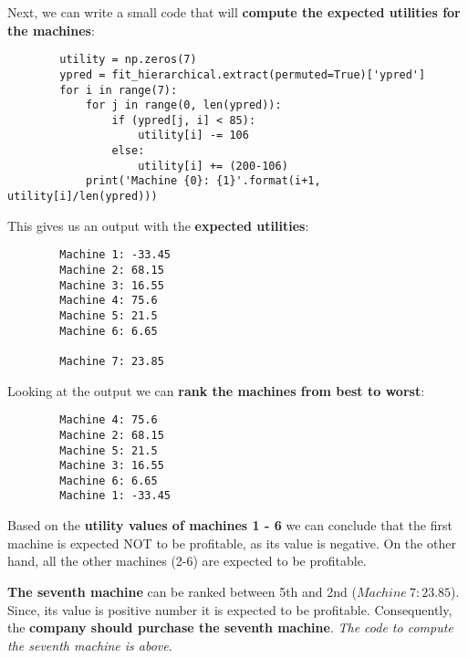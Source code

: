\documentclass[11pt,a4paper,english]{article}
\begin{document}
      Next, we can write a small code that will \textbf{compute the expected utilities for the machines}:

      \begin{verbatim}
        utility = np.zeros(7)
        ypred = fit_hierarchical.extract(permuted=True)['ypred']
        for i in range(7):
            for j in range(0, len(ypred)):
                if (ypred[j, i] < 85):
                    utility[i] -= 106
                else:
                    utility[i] += (200-106)
            print('Machine {0}: {1}'.format(i+1, utility[i]/len(ypred)))
      \end{verbatim}

      This gives us an output with the \textbf{expected utilities}:
      \begin{verbatim}
        Machine 1: -33.45
        Machine 2: 68.15
        Machine 3: 16.55
        Machine 4: 75.6
        Machine 5: 21.5
        Machine 6: 6.65

        Machine 7: 23.85
      \end{verbatim}

      Looking at the output we can \textbf{rank the machines from best to worst}:
      \begin{verbatim}
        Machine 4: 75.6
        Machine 2: 68.15
        Machine 5: 21.5
        Machine 3: 16.55
        Machine 6: 6.65
        Machine 1: -33.45
      \end{verbatim}

      Based on the \textbf{utility values of machines 1 - 6} we can conclude that the first machine is expected NOT to be profitable, as its value is negative. On the other hand, all the other machines (2-6) are expected to be profitable.

      \textbf{The seventh machine} can be ranked between 5th and 2nd ($Machine \ 7: 23.85$). Since, its value is positive number it is expected to be profitable. Consequently, the \textbf{company should purchase the seventh machine}.
      \textit{The code to compute the seventh machine is above}.
\end{document}
